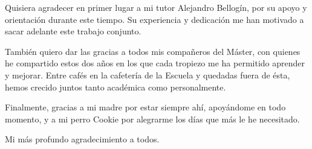Quisiera agradecer en primer lugar a mi tutor Alejandro Bellogín, por su apoyo y orientación durante este tiempo. Su experiencia y dedicación me han motivado a sacar adelante este trabajo conjunto.

También quiero dar las gracias a todos mis compañeros del Máster, con quienes he compartido estos dos años en los que cada tropiezo me ha permitido aprender y mejorar. Entre cafés en la cafetería de la Escuela y quedadas fuera de ésta, hemos crecido juntos tanto académica como personalmente.

Finalmente, gracias a mi madre por estar siempre ahí, apoyándome en todo momento, y a mi perro Cookie por alegrarme los días que más le he necesitado.

Mi más profundo agradecimiento a todos.